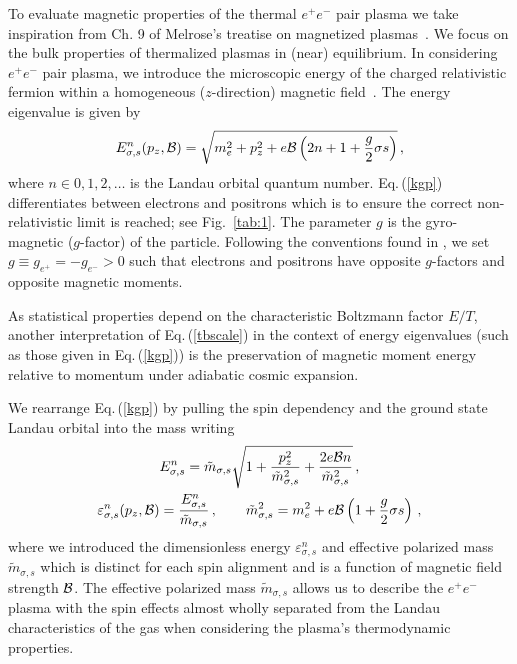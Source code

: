 \documentclass[aps,prd,floatfix,reprint]{revtex4-2}
\newcommand{\req}[1]{Eq.\,(\ref{#1})}
\newcommand{\rf}[1]{Fig.~{\ref{#1}}}
\begin{document}
To evaluate magnetic properties of the thermal $e^{+}e^{-}$ pair plasma we take inspiration from Ch. 9 of Melrose's treatise on magnetized plasmas~\cite{melrose2008quantum}. We focus on the bulk properties of thermalized plasmas in (near) equilibrium. In considering $e^{+}e^{-}$ pair plasma, we introduce the microscopic energy of the charged relativistic fermion within a homogeneous ($z$-direction) magnetic field~\cite{Steinmetz:2018ryf}. The energy eigenvalue is given by
\begin{align}
 \label{kgp}
 E^{n}_{\sigma,s}(p_{z},{\cal B})=\sqrt{m_{e}^{2}+p_{z}^{2}+e{\cal B}\left(2n+1+\frac{g}{2}\sigma s\right)}\,,
\end{align}
where $n\in0,1,2,\ldots$ is the Landau orbital quantum number. \req{kgp} differentiates between electrons and positrons which is to ensure the correct non-relativistic limit is reached; see \rf{tab:1}. The parameter $g$ is the gyro-magnetic ($g$-factor) of the particle. Following the conventions found in \cite{Tiesinga:2021myr}, we set $g\equiv g_{e^{+}}=-g_{e^{-}}>0$ such that electrons and positrons have opposite $g$-factors and opposite magnetic moments.

As statistical properties depend on the characteristic Boltzmann factor $E/T$, another interpretation of \req{tbscale} in the context of energy eigenvalues (such as those given in \req{kgp}) is the preservation of magnetic moment energy relative to momentum under adiabatic cosmic expansion.

We rearrange \req{kgp} by pulling the spin dependency and the ground state Landau orbital into the mass writing
\begin{gather}
 \label{effmass:1}
 E^{n}_{\sigma,s}={\tilde m}_{\sigma,s}\sqrt{1+\frac{p_{z}^{2}}{{\tilde m}_{\sigma,s}^{2}}+\frac{2e{\cal B}n}{{\tilde m}_{\sigma,s}^{2}}}\,,\\
 \label{effmass:2}
 \varepsilon_{\sigma,s}^{n}(p_{z},{\cal B})=\frac{E_{\sigma,s}^{n}}{{\tilde m}_{\sigma,s}}\,,\qquad{\tilde m}_{\sigma,s}^{2}=m_{e}^{2}+e{\cal B}\left(1+\frac{g}{2}\sigma s\right)\,,
\end{gather}
where we introduced the dimensionless energy $\varepsilon^{n}_{\sigma,s}$ and effective polarized mass ${\tilde m}_{\sigma,s}$ which is distinct for each spin alignment and is a function of magnetic field strength ${\cal B}$. The effective polarized mass ${\tilde m}_{\sigma,s}$ allows us to describe the $e^{+}e^{-}$ plasma with the spin effects almost wholly separated from the Landau characteristics of the gas when considering the plasma's thermodynamic properties.
\end{document}
